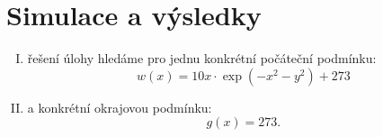 \documentclass[11pt,american,czech]{article}
\begin{document}
\section{Simulace a výsledky}

\begin{enumerate}[(I)]
	\item 	řešení úlohy hledáme pro jednu konkrétní počáteční podmínku:
		\begin{equation*}
			w(x)=10x\cdot\exp(-x^2-y^2)+273
		\end{equation*}
	\item 	a konkrétní okrajovou podmínku:
		\begin{equation*}
			g(x) = 273.
		\end{equation*}
\end{enumerate}




\newpage{}



%

\end{document}
